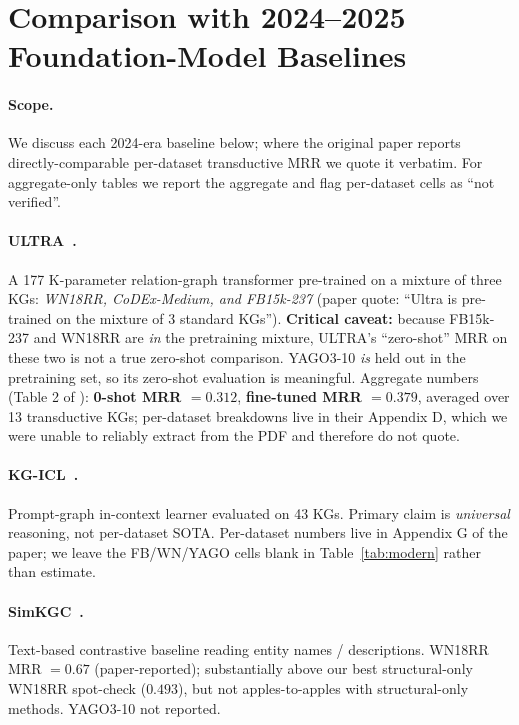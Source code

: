 \section{Comparison with 2024--2025 Foundation-Model Baselines}
\label{app:modern}

\paragraph{Scope.}
We discuss each 2024-era baseline below; where the original paper reports directly-comparable per-dataset transductive MRR we quote it verbatim. For aggregate-only tables we report the aggregate and flag per-dataset cells as ``not verified''.

\paragraph{ULTRA~\citep{galkin2024ultra}.}
A 177 K-parameter relation-graph transformer pre-trained on a mixture of three KGs: \emph{WN18RR, CoDEx-Medium, and FB15k-237} (paper quote: ``Ultra is pre-trained on the mixture of 3 standard KGs'').
\textbf{Critical caveat:} because FB15k-237 and WN18RR are \emph{in} the pretraining mixture, ULTRA's ``zero-shot'' MRR on these two is not a true zero-shot comparison.
YAGO3-10 \emph{is} held out in the pretraining set, so its zero-shot evaluation is meaningful.
Aggregate numbers (Table 2 of \citep{galkin2024ultra}): \textbf{0-shot MRR $= 0.312$}, \textbf{fine-tuned MRR $= 0.379$}, averaged over 13 transductive KGs; per-dataset breakdowns live in their Appendix D, which we were unable to reliably extract from the PDF and therefore do not quote.

\paragraph{KG-ICL~\citep{kgicl2024}.}
Prompt-graph in-context learner evaluated on 43 KGs. Primary claim is \emph{universal} reasoning, not per-dataset SOTA. Per-dataset numbers live in Appendix G of the paper; we leave the FB/WN/YAGO cells blank in Table~\ref{tab:modern} rather than estimate.

\paragraph{SimKGC~\citep{simkgc2022}.}
Text-based contrastive baseline reading entity names / descriptions. WN18RR MRR $= 0.67$ (paper-reported); substantially above our best structural-only WN18RR spot-check ($0.493$), but not apples-to-apples with structural-only methods. YAGO3-10 not reported.

